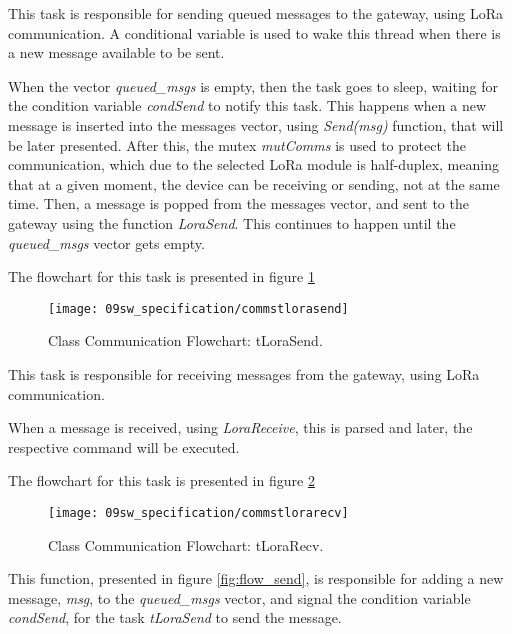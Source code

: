 
This task is responsible for sending queued messages to the gateway, using LoRa communication. A conditional variable is used to wake this thread when there is a new message available to be sent.

When the vector \textit{queued\_msgs} is empty, then the task goes to sleep, waiting for the condition variable \textit{condSend} to notify this task. This happens when a new message is inserted into the messages vector, using \textit{Send(msg)} function, that will be later presented. After this, the mutex \textit{mutComms} is used to protect the communication, which due to the selected LoRa module is half-duplex, meaning that at a given moment, the device can be receiving or sending, not at the same time. Then, a message is popped from the messages vector, and sent to the gateway using the function \textit{LoraSend}. This continues to happen until the \textit{queued\_msgs} vector gets empty.

The flowchart for this task is presented in figure \ref{fig:flow_tlorasend}

\begin{figure}[H]
	\centering		\texttt{[image: 09sw\_specification/commstlorasend]}
	\caption{Class Communication Flowchart: tLoraSend.}
	\label{fig:flow_tlorasend}
\end{figure}



This task is responsible for receiving messages from the gateway, using LoRa communication.

When a message is received, using \textit{LoraReceive}, this is parsed and later, the respective command will be executed.

The flowchart for this task is presented in figure \ref{fig:flow_tlorarecv}

\begin{figure}[H]
	\centering
	\texttt{[image: 09sw\_specification/commstlorarecv]}
	\caption{Class Communication Flowchart: tLoraRecv.}
	\label{fig:flow_tlorarecv}
\end{figure}


This function, presented in figure \ref{fig:flow_send}, is responsible for adding a new message, \textit{msg}, to the \textit{queued\_msgs} vector, and signal the condition variable \textit{condSend}, for the task \textit{tLoraSend} to send the message.

